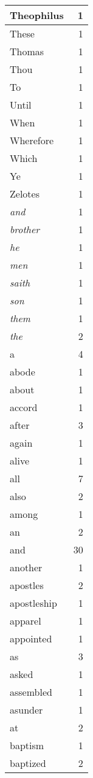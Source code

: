 \begin{center}
\begin{longtable}{l|r}
Theophilus & 1 \\ \hline
These & 1 \\ \hline
Thomas & 1 \\ \hline
Thou & 1 \\ \hline
To & 1 \\ \hline
Until & 1 \\ \hline
When & 1 \\ \hline
Wherefore & 1 \\ \hline
Which & 1 \\ \hline
Ye & 1 \\ \hline
Zelotes & 1 \\ \hline
\emph{and} & 1 \\ \hline
\emph{brother} & 1 \\ \hline
\emph{he} & 1 \\ \hline
\emph{men} & 1 \\ \hline
\emph{saith} & 1 \\ \hline
\emph{son} & 1 \\ \hline
\emph{them} & 1 \\ \hline
\emph{the} & 2 \\ \hline
a & 4 \\ \hline
abode & 1 \\ \hline
about & 1 \\ \hline
accord & 1 \\ \hline
after & 3 \\ \hline
again & 1 \\ \hline
alive & 1 \\ \hline
all & 7 \\ \hline
also & 2 \\ \hline
among & 1 \\ \hline
an & 2 \\ \hline
and & 30 \\ \hline
another & 1 \\ \hline
apostles & 2 \\ \hline
apostleship & 1 \\ \hline
apparel & 1 \\ \hline
appointed & 1 \\ \hline
as & 3 \\ \hline
asked & 1 \\ \hline
assembled & 1 \\ \hline
asunder & 1 \\ \hline
at & 2 \\ \hline
baptism & 1 \\ \hline
baptized & 2 \\ \hline

\end{longtable}
\end{center}
